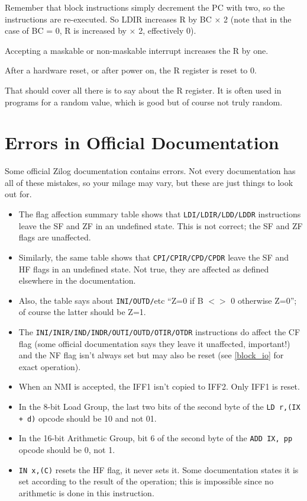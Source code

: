 \documentclass[12pt,twoside,openright,a4paper]{book}
\begin{document}
Remember that block instructions simply decrement the PC with two, so the instructions are re-executed. So LDIR increases R by BC $\times$ 2 (note that in the case of BC = 0, R is increased by  $\times$ 2, effectively 0).

Accepting a maskable or non-maskable interrupt increases the R by one.

After a hardware reset, or after power on, the R register is reset to 0.

That should cover all there is to say about the R register. It is often used in programs for a random value, which is good but of course not truly random.


\pagebreak
\section{Errors in Official Documentation}

Some official Zilog documentation contains errors. Not every documentation has all of these mistakes, so your milage may vary, but these are just things to look out for.

\begin{itemize}

	\item
	The flag affection summary table shows that {\tt LDI/LDIR/LDD/LDDR} instructions leave the SF and ZF in an undefined state. This is not correct; the SF and ZF flags are unaffected.

	\item
	Similarly, the same table shows that {\tt CPI/CPIR/CPD/CPDR} leave the SF and HF flags in an undefined state. Not true, they are affected as defined elsewhere in the documentation.

	\item
	Also, the table says about {\tt INI/OUTD/}etc ``Z=0 if B $<>$ 0 otherwise Z=0''; of course the latter should be Z=1.

	\item
	The {\tt INI/INIR/IND/INDR/OUTI/OUTD/OTIR/OTDR} instructions do affect the CF flag (some official documentation says they leave it unaffected, important!) and the NF flag isn't always set but may also be reset (see \ref{block_io} for exact operation).

	\item
	When an NMI is accepted, the IFF1 isn't copied to IFF2. Only IFF1 is reset.

	\item
	In the 8-bit Load Group, the last two bits of the second byte of the {\tt LD r,(IX + d)} opcode should be 10 and not 01.

	\item
	In the 16-bit Arithmetic Group, bit 6 of the second byte of the {\tt ADD IX, pp} opcode should be 0, not 1.

	\item
	{\tt IN x,(C)} resets the HF flag, it never sets it. Some documentation states it is set according to the result of the operation; this is impossible since no arithmetic is done in this instruction.

\end{itemize}
\end{document}
